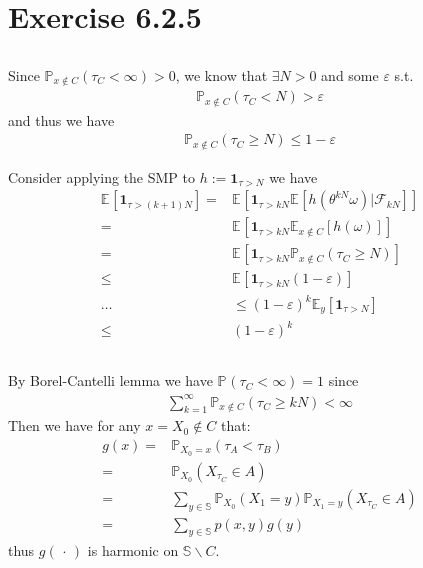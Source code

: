 \documentclass[11pt,a4paper]{ctexart}
\numberwithin{equation}{section}%
\newcommand{\F}{\mathcal{F}}
\begin{document}
\section{Exercise 6.2.5}


\subsection{}

Since $ \mathbb{P}_{ x\not\in C }\left( \tau_C <\infty \right) >0  $, we know that $ \exists N>0 $ and some $ \varepsilon  $ s.t. 
\begin{align*}
    \mathbb{P}_{ x\not\in C }\left( \tau_C <N \right) >\varepsilon 
\end{align*}
and thus we have
\begin{align*}
    \mathbb{P}_{ x\not\in C }\left( \tau_C \geq N \right) \leq 1-\varepsilon  
\end{align*}


Consider applying the SMP to $ h:= \mathbf{1}_{\tau >N} $ we have
\begin{align*}
    \mathbb{E}_{  }\left[ \mathbf{1}_{\tau > (k+1)N} \right] =& \mathbb{E}_{  }\left[ \mathbf{1}_{\tau > kN} \mathbb{E}_{  }\left[ h(\theta ^{kN}\omega ) | \F_{kN} \right] \right] \\  
    =& \mathbb{E}_{  }\left[ \mathbf{1}_{\tau > kN} \mathbb{E}_{ x\not\in C }\left[ h(\omega ) \right] \right] \\
    =& \mathbb{E}_{  }\left[ \mathbf{1}_{\tau > kN} \mathbb{P}_{ x\not\in C }\left( \tau_C \geq N \right) \right] \\
    \leq& \mathbb{E}_{  }\left[ \mathbf{1}_{\tau > kN} (1-\varepsilon ) \right] \\
    \ldots& \leq (1-\varepsilon )^k\mathbb{E}_{ y }\left[ \mathbf{1}_{\tau> N} \right]\\
    \leq& (1-\varepsilon )^k
\end{align*}




\subsection{}

By Borel-Cantelli lemma we have $ \mathbb{P}_{  }\left( \tau_C<\infty \right) =1  $ since
\begin{align*}
    \sum_{k=1}^\infty \mathbb{P}_{ x\not\in C }\left( \tau_C \geq kN \right) <\infty 
\end{align*}
Then we have for any $ x=X_0\not\in C $ that:
\begin{align*}
    g(x)=& \mathbb{P}_{ X_0=x }\left( \tau_A<\tau_B \right)  \\
    =& \mathbb{P}_{ X_0 }\left( X_{\tau_C} \in A \right)\\
    =& \sum_{y\in \mathbb{S}} \mathbb{P}_{ X_0 }\left( X_1 = y \right) \mathbb{P}_{ X_1=y }\left( X_{\tau_C} \in A \right) \\
    =& \sum_{y\in \mathbb{S}} p(x,y)g(y)
\end{align*}
thus $ g(\, \cdot \, ) $ is harmonic on $ \mathbb{S}\backslash C $.
\end{document}
